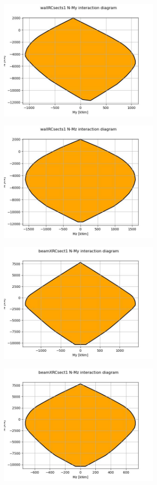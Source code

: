 
\begin{center}
\includegraphics[width=80mm]{results/graphics/sections/wallRCsects1NMy}
\end{center}
\begin{center}
\includegraphics[width=80mm]{results/graphics/sections/wallRCsects1NMz}
\end{center}

\begin{center}
\includegraphics[width=80mm]{results/graphics/sections/beamXRCsect1NMy}
\end{center}
\begin{center}
\includegraphics[width=80mm]{results/graphics/sections/beamXRCsect1NMz}
\end{center}
